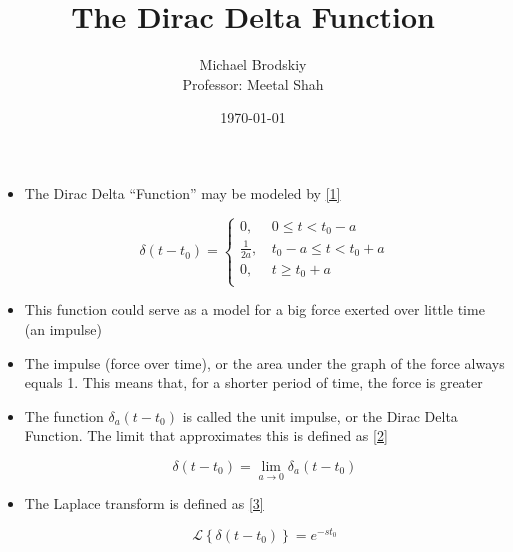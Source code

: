 \documentclass[12pt]{article}
\title{The Dirac Delta Function}
\date{\today}
\author{Michael Brodskiy\\ \small Professor: Meetal Shah}
\begin{document}
\maketitle

\begin{itemize}

  \item The Dirac Delta ``Function'' may be modeled by \eqref{1}

    \begin{equation}
      \delta(t-t_0)=\left\{\begin{array}{ll} 0,\, & 0\leq t < t_0-a\\ \frac{1}{2a},\, & t_0-a\leq t < t_0+a\\ 0,\, & t\geq t_0 + a\\ \end{array}
      \label{1}
    \end{equation}

  \item This function could serve as a model for a big force exerted over little time (an impulse)

  \item The impulse (force over time), or the area under the graph of the force always equals 1. This means that, for a shorter period of time, the force is greater

  \item The function $\delta_a(t-t_0)$ is called the unit impulse, or the Dirac Delta Function. The limit that approximates this is defined as \eqref{2}

    \begin{equation}
      \delta (t-t_0)=\lim_{a\to0}\delta_a(t-t_0)
      \label{2}
    \end{equation}

  \item The Laplace transform is defined as \eqref{3}

    \begin{equation}
      \mathcal{L}\left\{ \delta(t-t_0) \right\}=e^{-st_0}
      \label{3}
    \end{equation}

\end{itemize}
\end{document}
